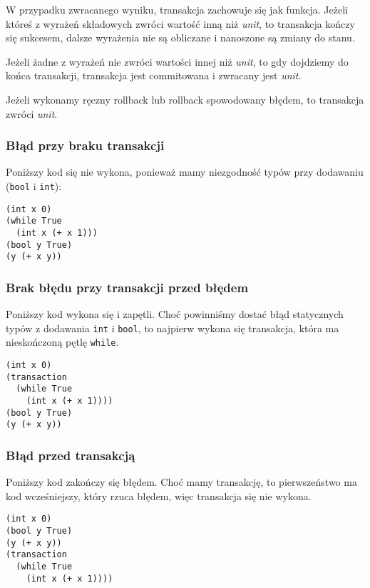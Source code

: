 \documentclass{article}
\begin{document}
W przypadku zwracanego wyniku, transakcja zachowuje się jak funkcja. Jeżeli któreś z wyrażeń składowych zwróci wartość inną niż \textit{unit}, to transakcja kończy się sukcesem, dalsze wyrażenia nie są obliczane i nanoszone są zmiany do stanu.

Jeżeli żadne z wyrażeń nie zwróci wartości innej niż \textit{unit}, to gdy dojdziemy do końca transakcji, transakcja jest commitowana i zwracany jest \textit{unit}.

Jeżeli wykonamy ręczny rollback lub rollback spowodowany błędem, to transakcja zwróci \textit{unit}.

\subsubsection{Błąd przy braku transakcji}

Poniższy kod się nie wykona, ponieważ mamy niezgodność typów przy dodawaniu (\texttt{bool} i \texttt{int}):

\begin{lstlisting}
(int x 0)
(while True
  (int x (+ x 1)))
(bool y True)
(y (+ x y))
\end{lstlisting}

\subsubsection{Brak błędu przy transakcji przed błędem}

Poniższy kod wykona się i zapętli. Choć powinniśmy dostać błąd statycznych typów z dodawania \texttt{int} i \texttt{bool}, to najpierw wykona się transakcja, która ma nieskończoną pętlę \texttt{while}.

\begin{lstlisting}
(int x 0)
(transaction
  (while True
    (int x (+ x 1))))
(bool y True)
(y (+ x y))
\end{lstlisting}

\subsubsection{Błąd przed transakcją}

Poniższy kod zakończy się błędem. Choć mamy transakcję, to pierwszeństwo ma kod wcześniejszy, który rzuca błędem, więc transakcja się nie wykona.

\begin{lstlisting}
(int x 0)
(bool y True)
(y (+ x y))
(transaction
  (while True
    (int x (+ x 1))))
\end{lstlisting}
\end{document}
